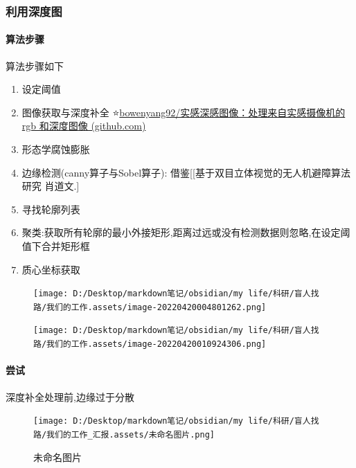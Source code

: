 \documentclass[]{article}
\let\oldparagraph\paragraph
\renewcommand{\paragraph}[1]{\oldparagraph{#1}\mbox{}}
\begin{document}
\hypertarget{ux5229ux7528ux6df1ux5ea6ux56fe}{%
\subsubsection{利用深度图}\label{ux5229ux7528ux6df1ux5ea6ux56fe}}

\hypertarget{ux7b97ux6cd5ux6b65ux9aa4}{%
\paragraph{算法步骤}\label{ux7b97ux6cd5ux6b65ux9aa4}}

算法步骤如下

\begin{enumerate}
\def\labelenumi{\arabic{enumi}.}
\item
  设定阈值
\item
  图像获取与深度补全
  ⭐️\href{https://github.com/bowenyang92/RealsenseDepthImage}{bowenyang92/实感深感图像：处理来自实感摄像机的
  rgb 和深度图像 (github.com)}
\item
  形态学腐蚀膨胀
\item
  边缘检测(canny算子与Sobel算子):
  借鉴{[}{[}基于双目立体视觉的无人机避障算法研究 肖道文.{]}
\item
  寻找轮廓列表
\item
  聚类:获取所有轮廓的最小外接矩形,距离过远或没有检测数据则忽略,在设定阈值下合并矩形框
\item
  质心坐标获取
\end{enumerate}

\begin{figure}
\centering
\texttt{[image: D:/Desktop/markdown笔记/obsidian/my life/科研/盲人找路/我们的工作.assets/image-20220420004801262.png]}
\caption{}
\end{figure}

\begin{figure}
\centering
\texttt{[image: D:/Desktop/markdown笔记/obsidian/my life/科研/盲人找路/我们的工作.assets/image-20220420010924306.png]}
\caption{}
\end{figure}

\hypertarget{ux5c1dux8bd5-2}{%
\paragraph{尝试}\label{ux5c1dux8bd5-2}}

深度补全处理前,边缘过于分散

\begin{figure}
\centering
\texttt{[image: D:/Desktop/markdown笔记/obsidian/my life/科研/盲人找路/我们的工作\_汇报.assets/未命名图片.png]}
\caption{未命名图片}
\end{figure}
\end{document}
